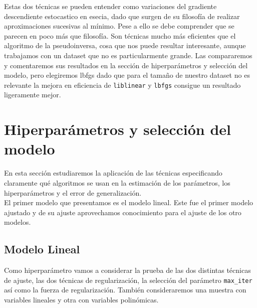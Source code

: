 \documentclass[11pt,a4paper]{article}
\begin{document}
Estas dos técnicas se pueden entender como variaciones del gradiente descendiente estocastico en esecia, dado que surgen de su filosofía de realizar aproximaciones sucesivas al mínimo. Pese a ello se debe comprender que se parecen en poco más que filosofía. Son técnicas mucho más eficientes que el algoritmo de la pseudoinversa, cosa que nos puede resultar interesante, aunque trabajamos con un dataset que no es particularmente grande. Las compararemos y comentaremos sus resultados  en la sección de hiperparámetros y selección del modelo, pero elegiremos lbfgs dado que para el tamaño de nuestro dataset no es relevante la mejora en eficiencia de \texttt{liblinear} y \texttt{lbfgs} consigue un resultado ligeramente mejor.


\section{Hiperparámetros y selección del modelo}
 En esta sección estudiaremos la aplicación de las técnicas especificando claramente qué algoritmos se usan en la estimación de los parámetros, los hiperparámetros y el error de generalización.\\
 
 
 El primer modelo que presentamos es el modelo lineal. Este fue el primer modelo ajustado y de su ajuste aprovechamos conocimiento para el ajuste de los otro modelos. 
 
\subsection{Modelo Lineal}
Como hiperparámetro vamos a considerar la prueba de las dos distintas técnicas de ajuste, las dos técnicas de regularización, la selección del parámetro \texttt{max\_iter} así como la fuerza de regularización. También consideraremos una muestra con variables lineales y otra con variables polinómicas. \\
\end{document}
